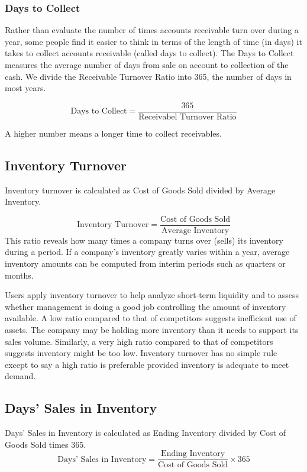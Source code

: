 \documentclass[../main.tex]{subfiles}
\begin{document}
	\subsubsection{Days to Collect}
	
	Rather than evaluate the number of times accounts receivable turn over 
	during a year, some people find it easier to think in terms of the length 
	of time (in days) it takes to collect accounts receivable (called days to 
	collect). The Days to Collect measures the average number of days from sale 
	on account to collection of the cash. We divide the Receivable Turnover 
	Ratio into 365, the number of days in most years.
	
	\[
	\text{Days to Collect} = \frac{365}{\text{Receivabel Turnover Ratio}}
	\]
	
	A higher number means a longer time to collect receivables.
	
	
	\subsection{Inventory Turnover}
	
	Inventory turnover is calculated as Cost of Goods Sold divided by Average Inventory. 
	
	\[
	\text{Inventory Turnover}= \frac{\text{Cost of Goods Sold}}{\text{Average Inventory}}
	\]
	This ratio 
	reveals how many times a company turns over (sells) its inventory during a period. If a company’s 
	inventory greatly varies within a year, average inventory amounts can be computed from interim 
	periods such as quarters or months.
	
	Users apply inventory turnover to help analyze short-term liquidity and to assess whether 
	management is doing a good job controlling the amount of inventory available. A low ratio compared 
	to that of competitors suggests inefficient use of assets. The company may be holding more 
	inventory than it needs to support its sales volume. Similarly, a very high ratio compared to that 
	of competitors suggests inventory might be too low. Inventory turnover has no simple rule except 
	to say a high ratio is preferable provided inventory is adequate to meet demand.
	
	\subsection{Days' Sales in Inventory}
	
	Days’ Sales in Inventory is calculated as Ending Inventory divided by Cost of Goods Sold times 365.
	\[
	\text{Days' Sales in Inventory} = \frac{\text{Ending Inventory}}{\text{Cost of Goods Sold}} \times 
	365
	\]
	
\end{document}
